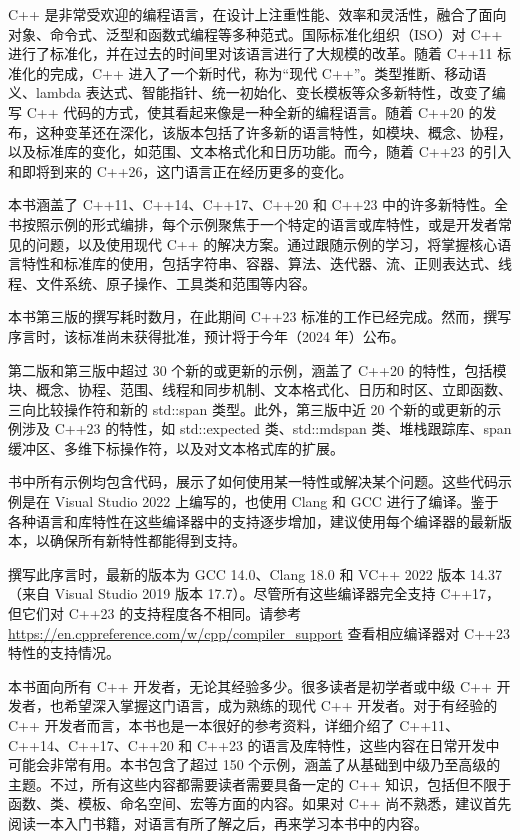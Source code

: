 
C++ 是非常受欢迎的编程语言，在设计上注重性能、效率和灵活性，融合了面向对象、命令式、泛型和函数式编程等多种范式。国际标准化组织（ISO）对 C++ 进行了标准化，并在过去的时间里对该语言进行了大规模的改革。随着 C++11 标准化的完成，C++ 进入了一个新时代，称为“现代 C++”。类型推断、移动语义、lambda 表达式、智能指针、统一初始化、变长模板等众多新特性，改变了编写 C++ 代码的方式，使其看起来像是一种全新的编程语言。随着 C++20 的发布，这种变革还在深化，该版本包括了许多新的语言特性，如模块、概念、协程，以及标准库的变化，如范围、文本格式化和日历功能。而今，随着 C++23 的引入和即将到来的 C++26，这门语言正在经历更多的变化。

本书涵盖了 C++11、C++14、C++17、C++20 和 C++23 中的许多新特性。全书按照示例的形式编排，每个示例聚焦于一个特定的语言或库特性，或是开发者常见的问题，以及使用现代 C++ 的解决方案。通过跟随示例的学习，将掌握核心语言特性和标准库的使用，包括字符串、容器、算法、迭代器、流、正则表达式、线程、文件系统、原子操作、工具类和范围等内容。

本书第三版的撰写耗时数月，在此期间 C++23 标准的工作已经完成。然而，撰写序言时，该标准尚未获得批准，预计将于今年（2024 年）公布。

第二版和第三版中超过 30 个新的或更新的示例，涵盖了 C++20 的特性，包括模块、概念、协程、范围、线程和同步机制、文本格式化、日历和时区、立即函数、三向比较操作符和新的 std::span 类型。此外，第三版中近 20 个新的或更新的示例涉及 C++23 的特性，如 std::expected 类、std::mdspan 类、堆栈跟踪库、span 缓冲区、多维下标操作符，以及对文本格式库的扩展。

书中所有示例均包含代码，展示了如何使用某一特性或解决某个问题。这些代码示例是在 Visual Studio 2022 上编写的，也使用 Clang 和 GCC 进行了编译。鉴于各种语言和库特性在这些编译器中的支持逐步增加，建议使用每个编译器的最新版本，以确保所有新特性都能得到支持。

撰写此序言时，最新的版本为 GCC 14.0、Clang 18.0 和 VC++ 2022 版本 14.37（来自 Visual Studio 2019 版本 17.7）。尽管所有这些编译器完全支持 C++17，但它们对 C++23 的支持程度各不相同。请参考  \url{https://en.cppreference.com/w/cpp/compiler_support} 查看相应编译器对 C++23 特性的支持情况。


本书面向所有 C++ 开发者，无论其经验多少。很多读者是初学者或中级 C++ 开发者，也希望深入掌握这门语言，成为熟练的现代 C++ 开发者。对于有经验的 C++ 开发者而言，本书也是一本很好的参考资料，详细介绍了 C++11、C++14、C++17、C++20 和 C++23 的语言及库特性，这些内容在日常开发中可能会非常有用。本书包含了超过 150 个示例，涵盖了从基础到中级乃至高级的主题。不过，所有这些内容都需要读者需要具备一定的 C++ 知识，包括但不限于函数、类、模板、命名空间、宏等方面的内容。如果对 C++ 尚不熟悉，建议首先阅读一本入门书籍，对语言有所了解之后，再来学习本书中的内容。


